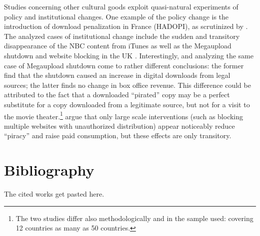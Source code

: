 \documentclass[
  11pt,
]{article}
\begin{document}
Studies concerning other cultural goods exploit quasi-natural
experiments of policy and institutional changes. One example of the
policy change is the introduction of download penalization in France
(HADOPI), as scrutinized by \citet{danaher_effect_2012}. The analyzed
cases of institutional change include the sudden and transitory
disappearance of the NBC content from iTunes
\citep[a case unrelated to unauthorized distribution, hence plausibly exogenous, see][]{danaher_converting_2010}
as well as the Megaupload shutdown
\citep{danaher_gone_2014,peukert_piracy_2013} and website blocking in
the UK \citep{danaher_website_2016}. Interestingly,
\citet{danaher_gone_2014} and \citet{peukert_piracy_2013} analyzing the
same case of Megaupload shutdown come to rather different conclusions:
the former find that the shutdown caused an increase in digital
downloads from legal sources; the latter finds no change in box office
revenue. This difference could be attributed to the fact that a
downloaded ``pirated'' copy may be a perfect substitute for a copy
downloaded from a legitimate source, but not for a visit to the movie
theater.\footnote{The two studies  differ also methodologically and in the sample used: \citet{danaher_gone_2014} covering 12 countries \citet{peukert_piracy_2013} as many as 50 countries.}
\citet{danaher_website_2016} argue that only large scale interventions
(such as blocking multiple websites with unauthorized distribution)
appear noticeably reduce ``piracy'' and raise paid consumption, but
these effects are only transitory.

\hypertarget{bibliography}{%
\section{Bibliography}\label{bibliography}}

The cited works get pasted here.

  
\end{document}
